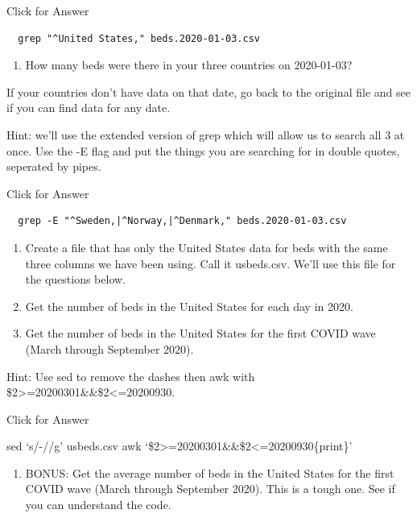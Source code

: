 \documentclass[
]{book}
\providecommand{\tightlist}{%
  \setlength{\itemsep}{0pt}\setlength{\parskip}{0pt}}
\begin{document}
Click for Answer

\begin{verbatim}
  grep "^United States," beds.2020-01-03.csv
\end{verbatim}

\hfill\break

\begin{enumerate}
\def\labelenumi{\arabic{enumi}.}
\setcounter{enumi}{17}
\tightlist
\item
  How many beds were there in your three countries on 2020-01-03?
\end{enumerate}

If your countries don't have data on that date, go back to the original file and see if you can find data for any date.

Hint: we'll use the extended version of grep which will allow us to search all 3 at once. Use the -E flag and put the things you are searching for in double quotes, seperated by pipes.

Click for Answer

\begin{verbatim}
  grep -E "^Sweden,|^Norway,|^Denmark," beds.2020-01-03.csv
\end{verbatim}

\hfill\break

\begin{enumerate}
\def\labelenumi{\arabic{enumi}.}
\setcounter{enumi}{18}
\item
  Create a file that has only the United States data for beds with the same three columns we have been using. Call it usbeds.csv. We'll use this file for the questions below.
\item
  Get the number of beds in the United States for each day in 2020.
\item
  Get the number of beds in the United States for the first COVID wave (March through September 2020).
\end{enumerate}

Hint: Use sed to remove the dashes then awk with \$2\textgreater=20200301\&\&\$2\textless=20200930.

Click for Answer

sed `s/-//g' usbeds.csv \textbar{} awk `\$2\textgreater=20200301\&\&\$2\textless=20200930\{print\}'

\hfill\break

\begin{enumerate}
\def\labelenumi{\arabic{enumi}.}
\setcounter{enumi}{21}
\tightlist
\item
  BONUS: Get the average number of beds in the United States for the first COVID wave (March through September 2020). This is a tough one. See if you can understand the code.
\end{enumerate}
\end{document}
